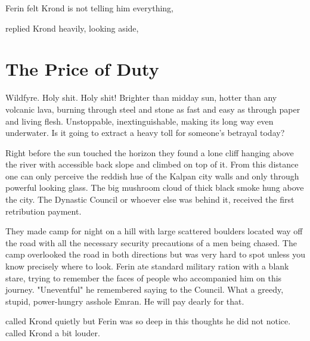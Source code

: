  Ferin felt Krond is not telling him everything, 

 replied Krond heavily, looking aside, 

\section{The Price of Duty}

Wildfyre. Holy shit. Holy shit! Brighter than midday sun, hotter than any volcanic lava, burning through steel and stone as fast and easy as through paper and living flesh. Unstoppable, inextinguishable, making its long way even underwater. Is it going to extract a heavy toll for someone's betrayal today?

Right before the sun touched the horizon they found a lone cliff hanging above the river with accessible back slope and climbed on top of it. From this distance one can only perceive the reddish hue of the Kalpan city walls and only through powerful looking glass. The big mushroom cloud of thick black smoke hung above the city. The Dynastic Council or whoever else was behind it, received the first retribution payment.

They made camp for night on a hill with large scattered boulders located way off the road with all the necessary security precautions of a men being chased. The camp overlooked the road in both directions but was very hard to spot unless you know precisely where to look. Ferin ate standard military ration with a blank stare, trying to remember the faces of people who accompanied him on this journey. "Uneventful" he remembered saying to the Council. What a greedy, stupid, power-hungry asshole Emran. He will pay dearly for that.

 called Krond quietly but Ferin was so deep in this thoughts he did not notice.  called Krond a bit louder.




